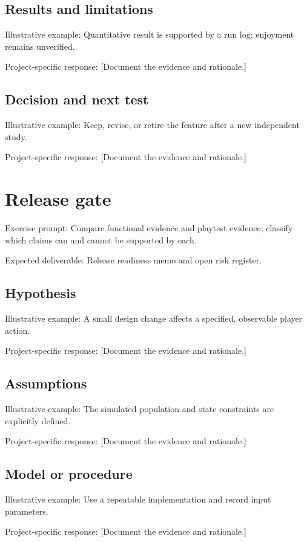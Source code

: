 \documentclass[11pt]{article}
\begin{document}
\subsection{Results and limitations}
Illustrative example: Quantitative result is supported by a run log; enjoyment remains unverified.

Project-specific response: [Document the evidence and rationale.]


\subsection{Decision and next test}
Illustrative example: Keep, revise, or retire the feature after a new independent study.

Project-specific response: [Document the evidence and rationale.]


\section{Release gate}
Exercise prompt: Compare functional evidence and playtest evidence; classify which claims can and cannot be supported by each.

Expected deliverable: Release readiness memo and open risk register.


\subsection{Hypothesis}
Illustrative example: A small design change affects a specified, observable player action.

Project-specific response: [Document the evidence and rationale.]


\subsection{Assumptions}
Illustrative example: The simulated population and state constraints are explicitly defined.

Project-specific response: [Document the evidence and rationale.]


\subsection{Model or procedure}
Illustrative example: Use a repeatable implementation and record input parameters.

Project-specific response: [Document the evidence and rationale.]
\end{document}
